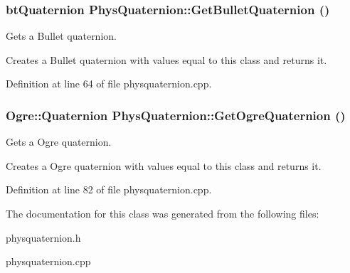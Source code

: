 \hypertarget{classPhysQuaternion_a63ed0cf13cd77d8e89af9748db2e4893}{
\subsubsection[{GetBulletQuaternion}]{\setlength{\rightskip}{0pt plus 5cm}btQuaternion PhysQuaternion::GetBulletQuaternion ()}}
\label{d5/d19/classPhysQuaternion_a63ed0cf13cd77d8e89af9748db2e4893}


Gets a Bullet quaternion. 

Creates a Bullet quaternion with values equal to this class and returns it. 

Definition at line 64 of file physquaternion.cpp.

\hypertarget{classPhysQuaternion_a30adc9ec3604da6ac9df49dc25b6fd31}{
\subsubsection[{GetOgreQuaternion}]{\setlength{\rightskip}{0pt plus 5cm}Ogre::Quaternion PhysQuaternion::GetOgreQuaternion ()}}
\label{d5/d19/classPhysQuaternion_a30adc9ec3604da6ac9df49dc25b6fd31}


Gets a Ogre quaternion. 

Creates a Ogre quaternion with values equal to this class and returns it. 

Definition at line 82 of file physquaternion.cpp.



The documentation for this class was generated from the following files:\begin{DoxyCompactItemize}
\item 
physquaternion.h\item 
physquaternion.cpp\end{DoxyCompactItemize}
